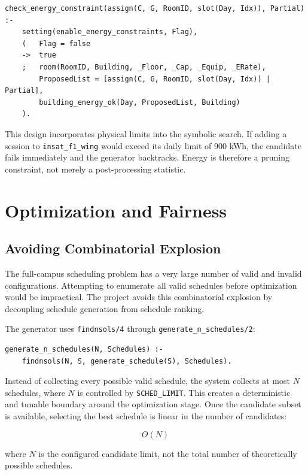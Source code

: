 \documentclass[12pt,a4paper]{article}
\newcommand{\predicate}[1]{\texttt{#1}}
\newcommand{\term}[1]{\texttt{#1}}
\begin{document}
\begin{lstlisting}[caption={Energy check during recursive generation}]
check_energy_constraint(assign(C, G, RoomID, slot(Day, Idx)), Partial) :-
    setting(enable_energy_constraints, Flag),
    (   Flag = false
    ->  true
    ;   room(RoomID, Building, _Floor, _Cap, _Equip, _ERate),
        ProposedList = [assign(C, G, RoomID, slot(Day, Idx)) | Partial],
        building_energy_ok(Day, ProposedList, Building)
    ).
\end{lstlisting}

This design incorporates physical limits into the symbolic search. If adding a session to \term{insat\_f1\_wing} would exceed its daily limit of 900 kWh, the candidate fails immediately and the generator backtracks. Energy is therefore a pruning constraint, not merely a post-processing statistic.

\section{Optimization and Fairness}

\subsection{Avoiding Combinatorial Explosion}

The full-campus scheduling problem has a very large number of valid and invalid configurations. Attempting to enumerate all valid schedules before optimization would be impractical. The project avoids this combinatorial explosion by decoupling schedule generation from schedule ranking.

The generator uses \predicate{findnsols/4} through \predicate{generate\_n\_schedules/2}:

\begin{lstlisting}[caption={Bounded candidate generation}]
generate_n_schedules(N, Schedules) :-
    findnsols(N, S, generate_schedule(S), Schedules).
\end{lstlisting}

Instead of collecting every possible valid schedule, the system collects at most \(N\) schedules, where \(N\) is controlled by \term{SCHED\_LIMIT}. This creates a deterministic and tunable boundary around the optimization stage. Once the candidate subset is available, selecting the best schedule is linear in the number of candidates:

\[
    O(N)
\]

where \(N\) is the configured candidate limit, not the total number of theoretically possible schedules.
\end{document}
